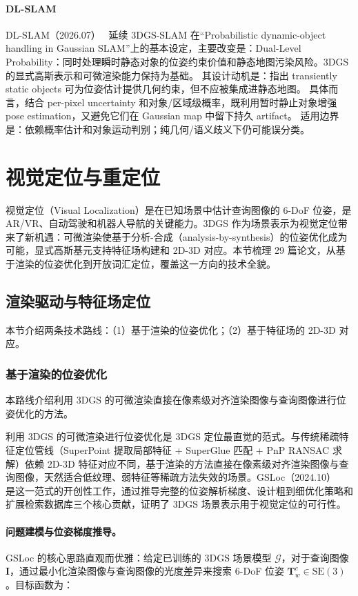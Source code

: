 \paragraph{DL-SLAM}
DL-SLAM（2026.07）~\cite{2607_01860} 延续 3DGS-SLAM 在“Probabilistic dynamic-object handling in Gaussian SLAM”上的基本设定，主要改变是：Dual-Level Probability：同时处理瞬时静态对象的位姿约束价值和静态地图污染风险。3DGS 的显式高斯表示和可微渲染能力保持为基础。
其设计动机是：指出 transiently static objects 可为位姿估计提供几何约束，但不应被集成进静态地图。
具体而言，结合 per-pixel uncertainty 和对象/区域级概率，既利用暂时静止对象增强 pose estimation，又避免它们在 Gaussian map 中留下持久 artifact。
适用边界是：依赖概率估计和对象运动判别；纯几何/语义歧义下仍可能误分类。
\section{视觉定位与重定位}
\label{sec:15_4}

视觉定位（Visual Localization）是在已知场景中估计查询图像的 6-DoF 位姿，是 AR/VR、自动驾驶和机器人导航的关键能力。3DGS 作为场景表示为视觉定位带来了新机遇：可微渲染使基于分析-合成（analysis-by-synthesis）的位姿优化成为可能，显式高斯基元支持特征场构建和 2D-3D 对应。本节梳理 29 篇论文，从基于渲染的位姿优化到开放词汇定位，覆盖这一方向的技术全貌。

\subsection{渲染驱动与特征场定位}
\label{ss:15_6}

本节介绍两条技术路线：（1）基于渲染的位姿优化；（2）基于特征场的 2D-3D 对应。

\subsubsection{基于渲染的位姿优化}

本路线介绍利用 3DGS 的可微渲染直接在像素级对齐渲染图像与查询图像进行位姿优化的方法。

利用 3DGS 的可微渲染进行位姿优化是 3DGS 定位最直觉的范式。与传统稀疏特征定位管线（SuperPoint 提取局部特征 + SuperGlue 匹配 + PnP RANSAC 求解）依赖 2D-3D 特征对应不同，基于渲染的方法直接在像素级对齐渲染图像与查询图像，天然适合低纹理、弱特征等稀疏方法失效的场景。GSLoc（2024.10）~\cite{2410_06165} 是这一范式的开创性工作，通过推导完整的位姿解析梯度、设计粗到细优化策略和扩展检索数据库三个核心贡献，证明了 3DGS 场景表示用于视觉定位的可行性。

\paragraph{问题建模与位姿梯度推导。}
GSLoc 的核心思路直观而优雅：给定已训练的 3DGS 场景模型 $\mathcal{G}$，对于查询图像 $\mathbf{I}$，通过最小化渲染图像与查询图像的光度差异来搜索 6-DoF 位姿 $\mathbf{T}_w^c \in \mathrm{SE}(3)$。目标函数为：

